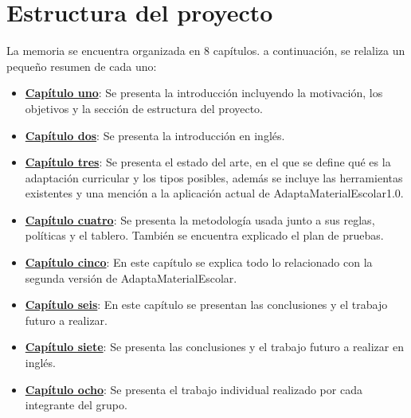 \section{Estructura del proyecto}\label{cap:estructura}
La memoria se encuentra organizada en 8 capítulos. a continuación, se relaliza un pequeño resumen de cada uno:
\begin{itemize}
    \item \textbf{\hyperref[ch:introduccion]{Capítulo uno}}: Se presenta la introducción incluyendo la motivación, los objetivos y la sección de estructura del proyecto.
    \item \textbf{\hyperref[cap:introduction]{Capítulo dos}}: Se presenta la introducción en inglés. 
    \item \textbf{\hyperref[cap:estadoDelArte]{Capítulo tres}}: Se presenta el estado del arte, en el que se define qué es la adaptación curricular y los tipos posibles, además se incluye las herramientas existentes y una mención a la aplicación actual de  AdaptaMaterialEscolar1.0.
    \item \textbf{\hyperref[cap:metodologia]{Capítulo cuatro}}: Se presenta la metodología usada junto a sus reglas, políticas y el tablero. También se encuentra explicado el plan de pruebas.
    \item \textbf{\hyperref[cap:AdaptaMaterialEscolar2.0]{Capítulo cinco}}: En este capítulo se explica todo lo relacionado con la segunda versión de AdaptaMaterialEscolar.
    \item \textbf{\hyperref[cap:conclusiones]{Capítulo seis}}: En este capítulo se presentan las conclusiones y el trabajo futuro a realizar.
    \item \textbf{\hyperref[cap:conclusions]{Capítulo siete}}: Se presenta las conclusiones y el trabajo futuro a realizar en inglés.
    \item \textbf{\hyperref[cap:trabajo_individual]{Capítulo ocho}}: Se presenta el trabajo individual realizado por cada integrante del grupo.
\end{itemize}